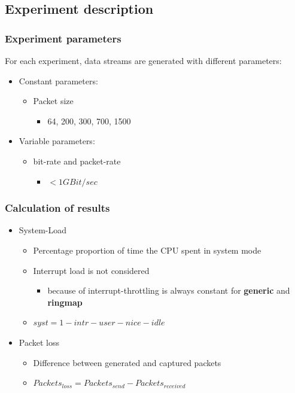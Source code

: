 \documentclass{beamer}
\begin{document}
\subsection*{Experiment description}


\begin{frame}
\frametitle{Experiment parameters}
For each experiment, data streams are generated with different parameters:
\begin{itemize}
	\item Constant parameters: 
		\begin{itemize}
			\item Packet size
				\begin{itemize}
					\item 64, 200, 300, 700, 1500
				\end{itemize}
		\end{itemize}
	\item Variable parameters: 
		\begin{itemize}
			\item bit-rate and packet-rate
				\begin{itemize}
					\item  $ < 1GBit/sec$
				\end{itemize}
		\end{itemize}
\end{itemize}

\end{frame}

\begin{frame}
\frametitle{Calculation of results}
\begin{itemize}
	\item System-Load
		\begin{itemize}
			\item Percentage proportion of time the CPU spent in system mode
			\item Interrupt load is not considered
				\begin{itemize}
					\item because of interrupt-throttling is always constant for \textbf{generic} and \textbf{ringmap}
				\end{itemize}
			\item $syst = 1 - intr - user - nice - idle$\newline
		\end{itemize}
	\item Packet loss
		\begin{itemize}
			\item Difference between generated and captured packets
			\item $Packets_{loss} = Packets_{send} - Packets_{received}$
		\end{itemize}
\end{itemize}
\end{frame}
\end{document}
